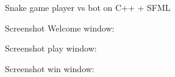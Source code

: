Snake game player vs bot on C++ + SFML

Screenshot Welcome window\+: ~\newline
 

 

Screenshot play window\+: ~\newline
 

 

Screenshot win window\+: ~\newline
 

 